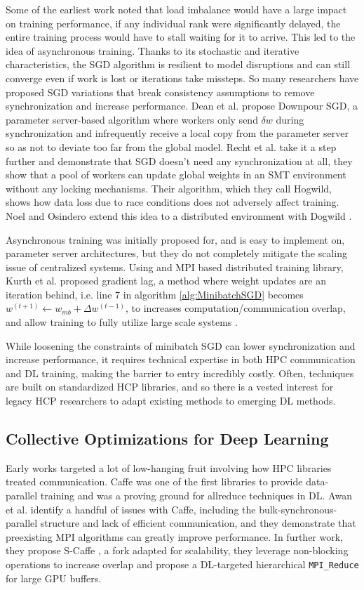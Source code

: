 Some of the earliest work noted that load imbalance would have a large impact on training performance, if any individual rank were significantly delayed, the entire training process would have to stall waiting for it to arrive.
This led to the idea of asynchronous training.
Thanks to its stochastic and iterative characteristics, the SGD algorithm is resilient to model disruptions and can still converge even if work is lost or iterations take missteps.
So many researchers have proposed SGD variations that break consistency assumptions to remove synchronization and increase performance.
Dean et al. \cite{Dean2012DistBelif} propose Downpour SGD, a parameter server-based algorithm where workers only send $\delta w$ during synchronization and infrequently receive a local copy from the parameter server so as not to deviate too far from the global model. 
Recht et al. \cite{Recht2011HogWild} take it a step further and demonstrate that SGD doesn't need any synchronization at all, they show that a pool of workers can update global weights in an SMT environment without any locking mechanisms.
Their algorithm, which they call Hogwild, shows how data loss due to race conditions does not adversely affect training.
Noel and Osindero extend this idea to a distributed environment with Dogwild \cite{Noel2014Dogwild}.

Asynchronous training was initially proposed for, and is easy to implement on, parameter server architectures, but they do not completely mitigate the scaling issue of centralized systems.
Using and MPI based distributed training library, Kurth et al. proposed gradient lag, a method where weight updates are an iteration behind, i.e. line 7 in algorithm \ref{alg:MinibatchSGD} becomes $w^{(t+1)}\leftarrow w_{mb} + \Delta w^{(t-1)}$, to increases computation/communication overlap, and allow training to fully utilize large scale systems \cite{Kurth2018ExascaleDLClimate}.

While loosening the constraints of minibatch SGD can lower synchronization and increase performance, it requires technical expertise in both HPC communication and DL training, making the barrier to entry incredibly costly.
Often, techniques are built on standardized HCP libraries, and so there is a vested interest for legacy HCP researchers to adapt existing methods to emerging DL methods.

\subsection{Collective Optimizations for Deep Learning}
Early works targeted a lot of low-hanging fruit involving how HPC libraries treated communication.
Caffe was one of the first libraries to provide data-parallel training and was a proving ground for allreduce techniques in DL.
Awan et al. \cite{Awan2017InDepthPerfCharOfDNN} identify a handful of issues with Caffe, including the bulk-synchronous-parallel structure and lack of efficient communication, and they demonstrate that preexisting MPI algorithms can greatly improve performance.
In further work, they propose S-Caffe \cite{Awan2017SCaffe}, a fork adapted for scalability, they leverage non-blocking operations to increase overlap and propose a DL-targeted hierarchical \texttt{MPI\_Reduce} for large GPU buffers.

